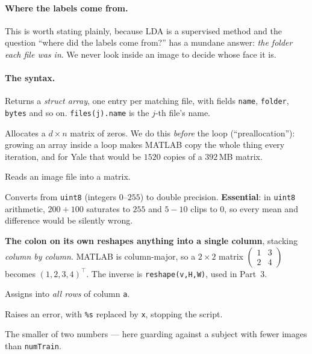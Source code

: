 \paragraph{Where the labels come from.} This is worth stating plainly, because
LDA is a supervised method and the question ``where did the labels come from?''
has a mundane answer: \emph{the folder each file was in}. We never look inside
an image to decide whose face it is.

\paragraph{The syntax.}
\begin{description}[leftmargin=*,style=nextline,nosep]
\item[\texttt{dir(pattern)}] Returns a \emph{struct array}, one entry per
  matching file, with fields \texttt{name}, \texttt{folder}, \texttt{bytes} and
  so on. \texttt{files(j).name} is the $j$-th file's name.
\item[\texttt{zeros(d,n)}] Allocates a $d\times n$ matrix of zeros. We do this
  \emph{before} the loop (``preallocation''): growing an array inside a loop
  makes MATLAB copy the whole thing every iteration, and for Yale that would be
  $1520$ copies of a $392$\,MB matrix.
\item[\texttt{imread(path)}] Reads an image file into a matrix.
\item[\texttt{double(\ldots)}] Converts from \texttt{uint8} (integers
  $0$--$255$) to double precision. \textbf{Essential}: in \texttt{uint8}
  arithmetic, $200 + 100$ saturates to $255$ and $5 - 10$ clips to $0$, so
  every mean and difference would be silently wrong.
\item[\texttt{im(:)}] \textbf{The colon on its own reshapes anything into a
  single column}, stacking \emph{column by column}. MATLAB is column-major, so
  a $2\times2$ matrix $\left(\begin{smallmatrix}1&3\\2&4\end{smallmatrix}\right)$ becomes
  $(1,2,3,4)^{\!\top}$. The inverse is \texttt{reshape(v,H,W)}, used in Part~3.
\item[\texttt{imTr(:, a) = \ldots}] Assigns into \emph{all rows} of column
  \texttt{a}.
\item[\texttt{error('\ldots \%s', x)}] Raises an error, with \texttt{\%s}
  replaced by \texttt{x}, stopping the script.
\item[\texttt{min(a,b)}] The smaller of two numbers --- here guarding against a
  subject with fewer images than \texttt{numTrain}.
\end{description}

